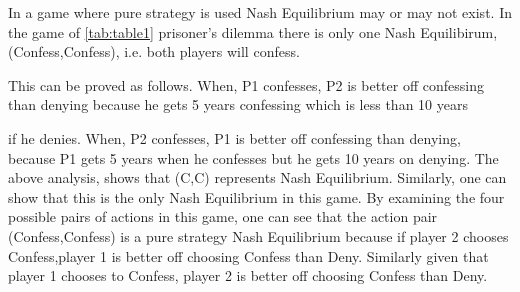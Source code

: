 In a game where pure strategy is used Nash Equilibrium may or may not exist. 
 In the game of 
 \ref{tab:table1}
 prisoner's dilemma
 there is only one Nash Equilibirum, (Confess,Confess), i.e. both players will confess.

This can be proved as follows. When, P1 confesses, P2 is better off confessing than denying because he gets 5 years confessing which is less than 10 years

if he denies. When, P2 confesses, P1 is better off confessing than denying, because  P1 gets 5 years when he confesses but he gets 10 years on denying. The above analysis, shows that (C,C) represents Nash Equilibrium. Similarly, one can show that this is the only Nash Equilibrium in this game.
By examining the four possible pairs of actions in this game, one can see that the action pair (Confess,Confess) is a pure strategy Nash Equilibrium because if player 2 chooses Confess,player 1 is better off choosing Confess than Deny. Similarly given that player 1 chooses to Confess, player 2 is better off choosing Confess than Deny.